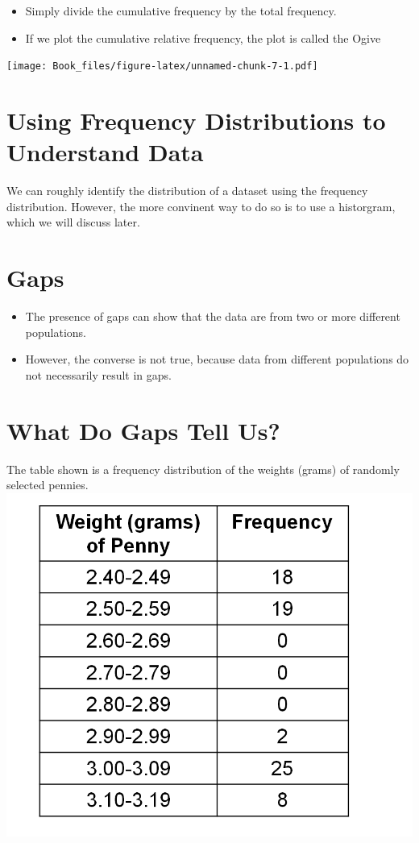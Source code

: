 \documentclass[]{book}
\providecommand{\tightlist}{%
  \setlength{\itemsep}{0pt}\setlength{\parskip}{0pt}}
\begin{document}
\begin{itemize}
\tightlist
\item
  Simply divide the cumulative frequency by the total frequency.
\item
  If we plot the cumulative relative frequency, the plot is called the Ogive
\end{itemize}

\texttt{[image: Book\_files/figure-latex/unnamed-chunk-7-1.pdf]}

\hypertarget{using-frequency-distributions-to-understand-data}{%
\section{Using Frequency Distributions to Understand Data}\label{using-frequency-distributions-to-understand-data}}

We can roughly identify the distribution of a dataset using the frequency distribution. However, the more convinent way to do so is to use a historgram, which we will discuss later.

\hypertarget{gaps}{%
\section{Gaps}\label{gaps}}

\begin{itemize}
\tightlist
\item
  The presence of gaps can show that the data are from two or more different populations.
\item
  However, the converse is not true, because data from different populations do not necessarily result in gaps.
\end{itemize}

\hypertarget{what-do-gaps-tell-us}{%
\section{What Do Gaps Tell Us?}\label{what-do-gaps-tell-us}}

The table shown is a frequency distribution of the weights (grams) of randomly selected pennies.\\
\includegraphics{gap.png}
\end{document}
